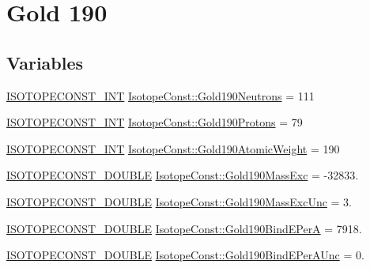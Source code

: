 \hypertarget{group___isotope_const-_gold-_au190}{}\section{Gold 190}
\label{group___isotope_const-_gold-_au190}
\subsection*{Variables}
\begin{DoxyCompactItemize}
\item 
\mbox{\hyperlink{group___isotope_const-_macros_ga5f18360b3e99483a35c32d789e62621c}{I\+S\+O\+T\+O\+P\+E\+C\+O\+N\+S\+T\+\_\+\+I\+NT}} \mbox{\hyperlink{group___isotope_const-_gold-_au190_gaf9196bb273ca04c90d2117c25e0ce616}{Isotope\+Const\+::\+Gold190\+Neutrons}} = 111
\item 
\mbox{\hyperlink{group___isotope_const-_macros_ga5f18360b3e99483a35c32d789e62621c}{I\+S\+O\+T\+O\+P\+E\+C\+O\+N\+S\+T\+\_\+\+I\+NT}} \mbox{\hyperlink{group___isotope_const-_gold-_au190_ga34cd0eeda0cda7d9e73aecf3c8ef1c8c}{Isotope\+Const\+::\+Gold190\+Protons}} = 79
\item 
\mbox{\hyperlink{group___isotope_const-_macros_ga5f18360b3e99483a35c32d789e62621c}{I\+S\+O\+T\+O\+P\+E\+C\+O\+N\+S\+T\+\_\+\+I\+NT}} \mbox{\hyperlink{group___isotope_const-_gold-_au190_gaf22c84d41c6d4d9d36871042a35142b6}{Isotope\+Const\+::\+Gold190\+Atomic\+Weight}} = 190
\item 
\mbox{\hyperlink{group___isotope_const-_macros_ga8f45a7272ce02c0b4c65c44636ed719a}{I\+S\+O\+T\+O\+P\+E\+C\+O\+N\+S\+T\+\_\+\+D\+O\+U\+B\+LE}} \mbox{\hyperlink{group___isotope_const-_gold-_au190_ga527029fdd7add5a2d228537a9f52d5e6}{Isotope\+Const\+::\+Gold190\+Mass\+Exc}} = -\/32833.
\item 
\mbox{\hyperlink{group___isotope_const-_macros_ga8f45a7272ce02c0b4c65c44636ed719a}{I\+S\+O\+T\+O\+P\+E\+C\+O\+N\+S\+T\+\_\+\+D\+O\+U\+B\+LE}} \mbox{\hyperlink{group___isotope_const-_gold-_au190_ga58164cfcca4fdd0c86b3c4b0e38f835a}{Isotope\+Const\+::\+Gold190\+Mass\+Exc\+Unc}} = 3.
\item 
\mbox{\hyperlink{group___isotope_const-_macros_ga8f45a7272ce02c0b4c65c44636ed719a}{I\+S\+O\+T\+O\+P\+E\+C\+O\+N\+S\+T\+\_\+\+D\+O\+U\+B\+LE}} \mbox{\hyperlink{group___isotope_const-_gold-_au190_gad154be415900da8e5d3330f1ce354917}{Isotope\+Const\+::\+Gold190\+Bind\+E\+PerA}} = 7918.
\item 
\mbox{\hyperlink{group___isotope_const-_macros_ga8f45a7272ce02c0b4c65c44636ed719a}{I\+S\+O\+T\+O\+P\+E\+C\+O\+N\+S\+T\+\_\+\+D\+O\+U\+B\+LE}} \mbox{\hyperlink{group___isotope_const-_gold-_au190_gab9f6650b6e3b7011e176696f888d223c}{Isotope\+Const\+::\+Gold190\+Bind\+E\+Per\+A\+Unc}} = 0.

\end{DoxyCompactItemize}
